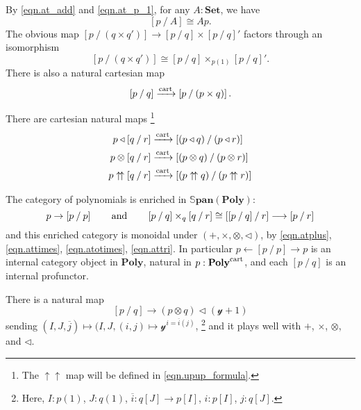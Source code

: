 \documentclass[11pt, one side, article]{memoir}
\theoremstyle{definition}
\theoremstyle{plain}
\newcommand{\Cat}[1]{\mathbf{#1}}%
\newcommand{\too}{\longrightarrow}
\newcommand{\To}[2][]{\xrightarrow[#1]{\tn{$#2$}}}
\newcommand{\from}{\leftarrow}
\newcommand{\tn}[1]{\textnormal{#1}}
\newcommand{\ol}[1]{\overline{#1}}
\newcommand{\smset}{\Cat{Set}}
\newcommand{\sspan}{\mathbb{S}\Cat{pan}}
\newcommand{\yon}{{\mathcal{y}}}
\newcommand{\poly}{\Cat{Poly}}
\newcommand{\cart}{\tn{cart}}
\newcommand{\tocart}{\To{\cart}}
\newcommand{\polycart}{\poly^\cart}
\newcommand{\0}{\textsf{0}}
\newcommand{\1}{\tn{\textsf{1}}}
\newcommand{\tri}{\mathbin{\triangleleft}}
\newcommand{\at}[2]{\left[#1\mathbin{/}#2\right]}
\newcommand{\upup}{\uparrow\!\uparrow}
\newcommand{\hh}[2][]{#1 \tn{#2} #1}
\newcommand{\qqand}{\hh[\qquad]{and}}
\begin{document}
By \eqref{eqn.at_add} and \eqref{eqn.at_p_1}, for any $A:\smset$, we have
\begin{equation}
\at{p}{A}\cong Ap.
\end{equation}
The obvious map $\at{p}{(q\times q')}\to\at{p}{q}\times\at{p}{q}'$ factors through an isomorphism
\begin{equation}
	\at{p}{(q\times q')}\cong\at{p}{q}\times_{p(1)}\at{p}{q}'.
\end{equation}
There is also a natural cartesian map
\begin{equation}
\at{p}{q}\tocart\at{p}{(p\times q)}.
\end{equation}


There are cartesian natural maps%
\footnote{The $\upup$ map will be defined in \eqref{eqn.upup_formula}.}
\begin{align}
  p\tri\at{q}{r}&\tocart \at{(p\tri q)}{(p\tri r)}\\
  p\otimes\at{q}{r}&\tocart \at{(p\otimes q)}{(p\otimes r)}\\
  p\upup\at{q}{r}&\tocart\at{(p\upup q)}{(p\upup r)}
\end{align}

The category of polynomials is enriched in $\sspan(\poly)$:
\begin{equation}
  p\to\at{p}{p}
  \qqand
	\at{p}{q}\times_q\at{q}{r}\cong\at{\at{p}{q}}{r}\too \at{p}{r}
\end{equation}
and this enriched category is monoidal under $(+,\times,\otimes,\tri)$, by \eqref{eqn.atplus}, \eqref{eqn.attimes}, \eqref{eqn.atotimes}, \eqref{eqn.attri}. In particular $p\from\at{p}{p}\to p$ is an internal category object in $\poly$, natural in $p:\polycart$, and each $\at{p}{q}$ is an internal profunctor. 

There is a natural map
\begin{equation}
	\at{p}{q}\to(p\otimes q)\tri(\yon+1)
\end{equation}
sending $(I,J,\ol{j})\mapsto(I,J,(i,j)\mapsto \yon^{i=\ol{i}(j)}$,%
\footnote{
Here, $I:p(1)$, $J:q(1)$, $\ol{i}\colon q[J]\to p[I]$, $i:p[I]$, $j:q[J]$.
}
and it plays well with $+$, $\times$, $\otimes$, and $\tri$.
\end{document}
